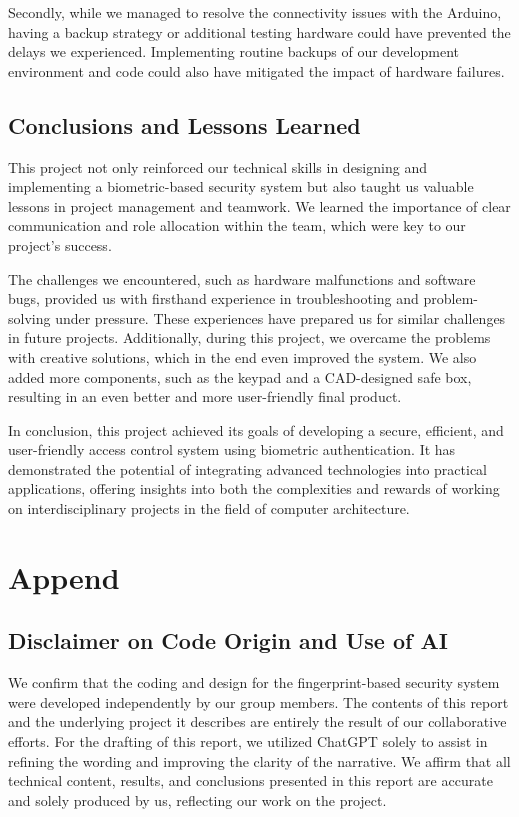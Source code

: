 \documentclass{article}
\begin{document}
Secondly, while we managed to resolve the connectivity issues with the Arduino, having a backup strategy or additional testing hardware could have prevented the delays we experienced. Implementing routine backups of our development environment and code could also have mitigated the impact of hardware failures.

\subsection{Conclusions and Lessons Learned}
This project not only reinforced our technical skills in designing and implementing a biometric-based security system but also taught us valuable lessons in project management and teamwork. We learned the importance of clear communication and role allocation within the team, which were key to our project's success.

The challenges we encountered, such as hardware malfunctions and software bugs, provided us with firsthand experience in troubleshooting and problem-solving under pressure. These experiences have prepared us for similar challenges in future projects. Additionally, during this project, we overcame the problems with creative solutions, which in the end even improved the system. We also added more components, such as the keypad and a CAD-designed safe box, resulting in an even better and more user-friendly final product.

In conclusion, this project achieved its goals of developing a secure, efficient, and user-friendly access control system using biometric authentication. It has demonstrated the potential of integrating advanced technologies into practical applications, offering insights into both the complexities and rewards of working on interdisciplinary projects in the field of computer architecture.
\newpage
\section{Append}

\subsection{Disclaimer on Code Origin and Use of AI}
We confirm that the coding and design for the fingerprint-based security system were developed independently by our group members. The contents of this report and the underlying project it describes are entirely the result of our collaborative efforts. For the drafting of this report, we utilized ChatGPT solely to assist in refining the wording and improving the clarity of the narrative. We affirm that all technical content, results, and conclusions presented in this report are accurate and solely produced by us, reflecting our work on the project.
\end{document}
